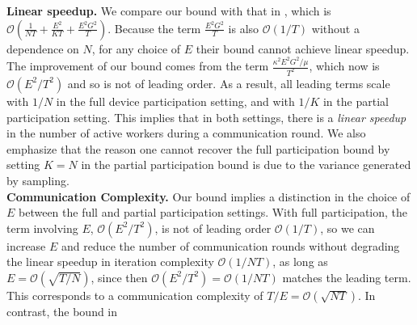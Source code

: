\begin{comment}
A crucial ingredient in the proof of Theorem~\ref{th:scvx_sgd} is a one step contraction bound 
	\begin{align*}
	\mathbb{E}\|\ov{w}_{t+1}-\vw^{\ast}\|^{2} & \leq(1-\mu\alpha_{t})\mathbb{E}\|\ov{w}_{t}-\vw^{\ast}\|^{2}+\alpha_{t}^{2}\frac{1}{N}\nu_{max}^{2}\sigma^{2}+6E^{2}L\alpha_{t}^{3}G^{2} 
	\end{align*}
that improves upon the analysis in~\cite{li2019convergence} to deliver the linear speedup. Moreover, analogues of this bound appear in the analyses of the convex setting as well as the Nesterov accelerated FedAvg.\\
\end{comment}

\textbf{Linear speedup. }We compare our bound with that in \cite{li2019convergence},
which is $\mathcal{O}(\frac{1}{NT}+\frac{E^{2}}{KT}+\frac{E^{2}G^{2}}{T})$.
Because the term $\frac{E^{2}G^{2}}{T}$ is also $\mathcal{O}(1/T)$
without a dependence on $N$, for any choice of $E$ their bound cannot
achieve linear speedup. The improvement of our bound comes from the
term $\frac{\kappa^{2}E^{2}G^{2}/\mu}{T^{2}}$, which now is $\mathcal{O}(E^{2}/T^{2})$ and so is not of leading order. As a result, all leading terms scale with $1/N$ in the full device
participation setting, and with $1/K$ in the partial participation
setting. This implies that in both settings, there is a \emph{linear
	speedup} in the number of active workers during a communication
round. We also emphasize that the reason one cannot recover the full participation bound by setting $K=N$ in the partial participation bound is due to the variance generated by sampling. \\
\textbf{Communication Complexity.} Our bound implies a distinction
in the choice of $E$ between the full and partial participation settings.
{\color{red}With full participation, the term involving $E$, $\mathcal{O}(E^{2}/T^{2})$, is not of leading order $\mathcal{O}(1/T)$, so we can increase $E$ and reduce the number of communication rounds without degrading the linear speedup in iteration complexity $\mathcal{O}(1/NT)$, as long as $E=\mathcal{O}(\sqrt{T/N})$, since then $\mathcal{O}(E^{2}/T^{2})=\mathcal{O}(1/NT)$
matches the leading term. This corresponds to a communication complexity
of $T/E=\mathcal{O}(\sqrt{NT})$.} In contrast, the bound in \cite{li2019convergence}
